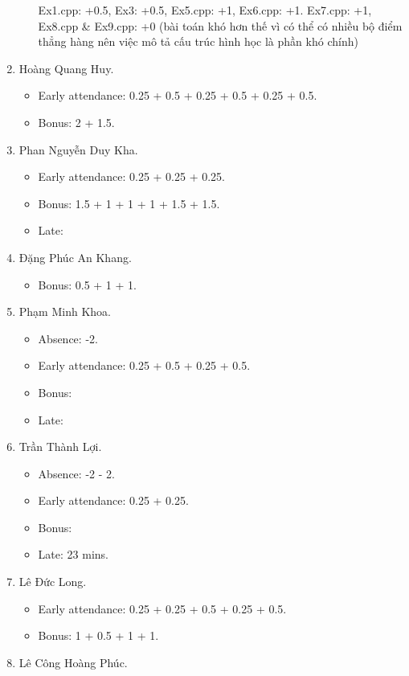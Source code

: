 \documentclass{article}
\begin{document}
\begin{enumerate}
\begin{itemize}
		Ex1.cpp: +0.5, Ex3: +0.5, Ex5.cpp: +1, Ex6.cpp: +1. Ex7.cpp: +1, Ex8.cpp \& Ex9.cpp: +0 (bài toán khó hơn thế vì có thể có nhiều bộ điểm thẳng hàng nên việc mô tả cấu trúc hình học là phần khó chính)
	\end{itemize}
	\item {\sc Hoàng Quang Huy.}
	\begin{itemize}
		\item Early attendance: 0.25 + 0.5 + 0.25 + 0.5 + 0.25 + 0.5.
		\item Bonus: 2 + 1.5.
	\end{itemize}
	\item {\sc Phan Nguyễn Duy Kha.}
	\begin{itemize}
		\item Early attendance: 0.25 + 0.25 + 0.25.
		\item Bonus: 1.5 + 1 + 1 + 1 + 1.5 + 1.5.
		\item Late: 
	\end{itemize}
	\item {\sc Đặng Phúc An Khang.}
	\begin{itemize}
		\item Bonus: 0.5 + 1 + 1.
	\end{itemize}
	\item {\sc Phạm Minh Khoa.}
	\begin{itemize}
		\item Absence: -2.
		\item Early attendance: 0.25 + 0.5 + 0.25 + 0.5.
		\item Bonus:
		\item Late: 
	\end{itemize}
	\item {\sc Trần Thành Lợi.}
	\begin{itemize}
		\item Absence: -2 - 2.
		\item Early attendance: 0.25 + 0.25.
		\item Bonus: 
		\item Late: 23 mins.
	\end{itemize}
	\item {\sc Lê Đức Long.}
	\begin{itemize}
		\item Early attendance: 0.25 + 0.25 + 0.5 + 0.25 + 0.5.
		\item Bonus: 1 + 0.5 + 1 + 1.
	\end{itemize}
	\item {\sc Lê Công Hoàng Phúc.}
	\begin{itemize}

\end{itemize}
\end{enumerate}
\end{document}
